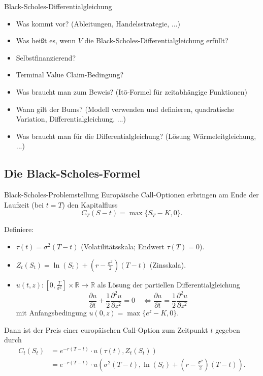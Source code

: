 \begin{info}{Black-Scholes-Differentialgleichung}
    \begin{itemize}
        \item Was kommt vor? (Ableitungen, Handelsstrategie, ...)
        \item Was heißt es, wenn $V$ die Black-Scholes-Differentialgleichung erfüllt?
        \item Selbstfinanzierend?
        \item Terminal Value Claim-Bedingung?
        \item Was braucht man zum Beweis? (Itō-Formel für zeitabhängige Funktionen)
        \item Wann gilt der Bums? (Modell verwenden und definieren, quadratische Variation, Differentialgleichung, ...)
        \item Was braucht man für die Differentialgleichung? (Lösung Wärmeleitgleichung, ...)
    \end{itemize}
\end{info}

\subsection{Die Black-Scholes-Formel}

\begin{bonus}{Black-Scholes-Problemstellung}
    Europäische Call-Optionen erbringen am Ende der Laufzeit (bei $t=T$) den Kapitalfluss
    \[
        C_T(S-t) = \max\{S_T - K, 0\}.
    \]

    Definiere:
    \begin{itemize}
        \item $\tau(t) = \sigma^2 (T-t)$ (Volatilitätsskala; Endwert $\tau(T) = 0$).
        \item $Z_t(S_t) = \ln(S_t) + (r - \frac{\sigma^2}{2}) (T-t)$ (Zinsskala).
        \item $u(t, z): [0, \frac{T}{\sigma^2}] \times \mathbb{R} \to \mathbb{R}$ als Lösung der partiellen Differentialgleichung
              \[
                  \frac{\partial u}{\partial t} + \frac{1}{2} \frac{\partial^2 u}{\partial z^2} = 0 \quad \iff \frac{\partial u}{\partial t} = \frac{1}{2} \frac{\partial^2 u}{\partial z^2}
              \] mit Anfangsbedingung $u(0, z) = \max\{e^z - K, 0\}$.
    \end{itemize}

    Dann ist der Preis einer europäischen Call-Option zum Zeitpunkt $t$ gegeben durch
    \[
        \begin{aligned}
            C_t(S_t) & = e^{-r(T-t)} \cdot u(\tau(t), Z_t(S_t))                                                        \\
                     & = e^{-r(T-t)} \cdot u \left( \sigma^2 (T-t), \ln(S_t) + (r - \frac{\sigma^2}{2}) (T-t) \right).
        \end{aligned}
    \]
\end{bonus}


